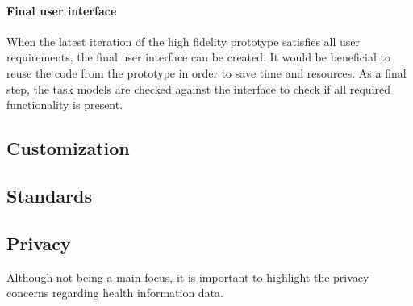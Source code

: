         \paragraph{Final user interface} When the latest iteration of the high fidelity prototype satisfies all user requirements, the final user interface can be created. It would be beneficial to reuse the code from the prototype in order to save time and resources. As a final step, the task models are checked against the interface to check if all required functionality is present.\\


    \subsection{Customization}

    \subsection{Standards} \label{2_standards}

    \subsection{Privacy}
    Although not being a main focus, it is important to highlight the privacy concerns regarding health information data.

    

        

        


